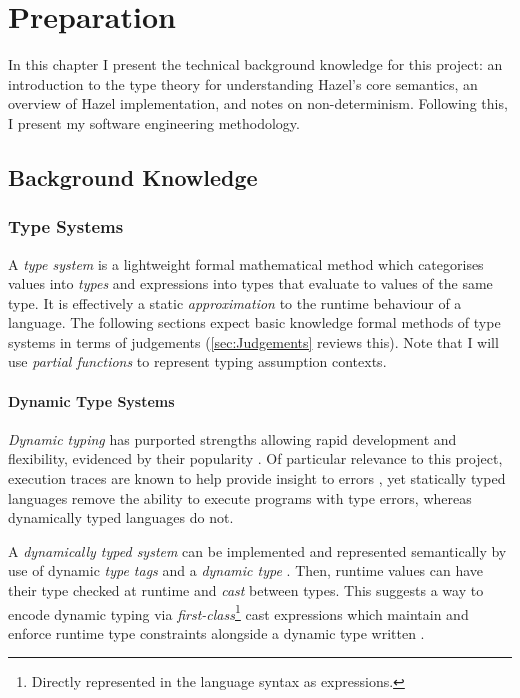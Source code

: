 \chapter{Preparation}
\label{chap:Preparation}
In this chapter I present the technical background knowledge for this project: an introduction to the type theory for understanding Hazel's core semantics, an overview of Hazel implementation, and notes on non-determinism. Following this, I present my software engineering methodology.

\section{Background Knowledge}\label{sec:BackgroundKnowledge}
\subsection{Type Systems}\label{sec:TypeSystems}
A \textit{type system} is a lightweight formal mathematical method which categorises values into \textit{types} and expressions into types that evaluate to values of the same type. It is effectively a static \textit{approximation} to the runtime behaviour of a language. The following sections expect basic knowledge formal methods of type systems in terms of judgements (\cref{sec:Judgements} reviews this). Note that I will use \textit{partial functions} to represent typing assumption contexts. 


\subsubsection{Dynamic Type Systems}\label{sec:DynamicTypeSystem}
\textit{Dynamic typing} has purported strengths allowing rapid development and flexibility, evidenced by their popularity \cite{DynamicLangShift, TIOBE}. Of particular relevance to this project, execution traces are known to help provide insight to errors \cite{TraceVisualisation}, yet statically typed languages remove the ability to execute programs with type errors, whereas dynamically typed languages do not.\par 

A \textit{dynamically typed system} can be implemented and represented semantically by use of dynamic \textit{type tags} and a \textit{dynamic type} \cite{DynamicTyping}. Then, runtime values can have their type checked at runtime and \textit{cast} between types. This suggests a way to encode dynamic typing via \textit{first-class}\footnote{Directly represented in the language syntax as expressions.} cast expressions which maintain and enforce runtime type constraints alongside a dynamic type written \dyn.

